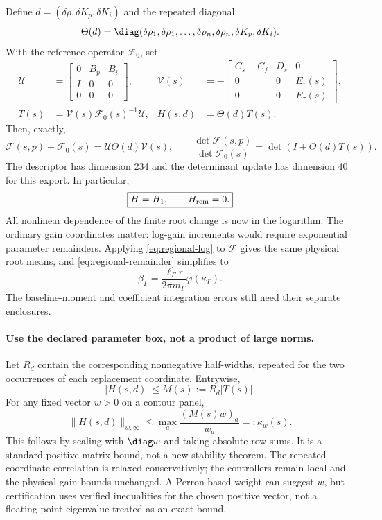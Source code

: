 Define $d=(\delta\rho,\delta K_p,\delta K_i)$ and the repeated diagonal
\[
 \Theta(d)=\diag(\delta\rho_1,\delta\rho_1,\ldots,
                \delta\rho_n,\delta\rho_n,\delta K_p,\delta K_i).
\]
With the reference operator $\mathcal F_0$, set
\begin{align}
 \mathcal U&=
 \begin{bmatrix}
 0&B_p&B_i\\ I&0&0\\0&0&0
 \end{bmatrix},&
 \mathcal V(s)&=-
 \begin{bmatrix}
 C_s-C_f&D_s&0\\
 0&0&E_\tau(s)\\
 0&0&E_\tau(s)
 \end{bmatrix},\\
 T(s)&=\mathcal V(s)\mathcal F_0(s)^{-1}\mathcal U,&
 H(s,d)&=\Theta(d)T(s). \label{eq:affine-return}
\end{align}
Then, exactly,
\[
 \mathcal F(s,p)-\mathcal F_0(s)
       =\mathcal U\Theta(d)\mathcal V(s),\qquad
 \frac{\det\mathcal F(s,p)}{\det\mathcal F_0(s)}
       =\det(I+\Theta(d)T(s)).
\]
The descriptor has dimension 234 and the determinant update has
dimension 40 for this export. In particular,
\[
 \boxed{H=H_1,\qquad H_{\rm rem}=0.}
\]
All nonlinear dependence of the finite root change is now in the
logarithm. The ordinary gain coordinates matter: log-gain increments
would require exponential parameter remainders.
Applying \eqref{eq:regional-log} to $\mathcal F$ gives the same
physical root means, and \eqref{eq:regional-remainder} simplifies to
\begin{equation}
 \boxed{\beta_\Gamma
   =\frac{\ell_\Gamma r}{2\pi m_\Gamma}
          \varphi(\kappa_\Gamma).} \label{eq:affine-remainder}
\end{equation}
The baseline-moment and coefficient integration errors still need
their separate enclosures.

\paragraph{Use the declared parameter box, not a product of large norms.}
Let $R_d$ contain the corresponding nonnegative half-widths, repeated
for the two occurrences of each replacement coordinate. Entrywise,
\[
 |H(s,d)|\le M(s):=R_d|T(s)|.
\]
For any fixed vector $w>0$ on a contour panel,
\begin{equation}
 \|H(s,d)\|_{w,\infty}
 \le \max_a\frac{(M(s)w)_a}{w_a}
 =:\kappa_w(s). \label{eq:positive-envelope}
\end{equation}
This follows by scaling with $\diag w$ and taking absolute row sums.
It is a standard positive-matrix bound, not a new stability theorem.
The repeated-coordinate correlation is relaxed conservatively;
the controllers remain local and the physical gain bounds unchanged.
A Perron-based weight can suggest $w$, but certification uses verified
inequalities for the chosen positive vector, not a floating-point
eigenvalue treated as an exact bound.

